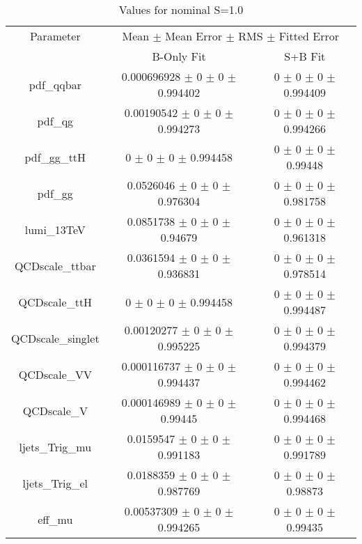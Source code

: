 \begin{table}
\centering
\caption{Values for nominal S=1.0}
\begin{tabular}{ccc}
\toprule
Parameter 	& \multicolumn{2}{c}{Mean $\pm$ Mean Error $\pm$ RMS $\pm$ Fitted Error}\\
 	& B-Only Fit & S+B Fit\\
\midrule
pdf\_qqbar 	& \num{0.000696928} $\pm$ \num{0} $\pm$ \num{0} $\pm$ \num{0.994402} 	& \num{0} $\pm$ \num{0} $\pm$ \num{0} $\pm$ \num{0.994409}\\
pdf\_qg 	& \num{0.00190542} $\pm$ \num{0} $\pm$ \num{0} $\pm$ \num{0.994273} 	& \num{0} $\pm$ \num{0} $\pm$ \num{0} $\pm$ \num{0.994266}\\
pdf\_gg\_ttH 	& \num{0} $\pm$ \num{0} $\pm$ \num{0} $\pm$ \num{0.994458} 	& \num{0} $\pm$ \num{0} $\pm$ \num{0} $\pm$ \num{0.99448}\\
pdf\_gg 	& \num{0.0526046} $\pm$ \num{0} $\pm$ \num{0} $\pm$ \num{0.976304} 	& \num{0} $\pm$ \num{0} $\pm$ \num{0} $\pm$ \num{0.981758}\\
lumi\_13TeV 	& \num{0.0851738} $\pm$ \num{0} $\pm$ \num{0} $\pm$ \num{0.94679} 	& \num{0} $\pm$ \num{0} $\pm$ \num{0} $\pm$ \num{0.961318}\\
QCDscale\_ttbar 	& \num{0.0361594} $\pm$ \num{0} $\pm$ \num{0} $\pm$ \num{0.936831} 	& \num{0} $\pm$ \num{0} $\pm$ \num{0} $\pm$ \num{0.978514}\\
QCDscale\_ttH 	& \num{0} $\pm$ \num{0} $\pm$ \num{0} $\pm$ \num{0.994458} 	& \num{0} $\pm$ \num{0} $\pm$ \num{0} $\pm$ \num{0.994487}\\
QCDscale\_singlet 	& \num{0.00120277} $\pm$ \num{0} $\pm$ \num{0} $\pm$ \num{0.995225} 	& \num{0} $\pm$ \num{0} $\pm$ \num{0} $\pm$ \num{0.994379}\\
QCDscale\_VV 	& \num{0.000116737} $\pm$ \num{0} $\pm$ \num{0} $\pm$ \num{0.994437} 	& \num{0} $\pm$ \num{0} $\pm$ \num{0} $\pm$ \num{0.994462}\\
QCDscale\_V 	& \num{0.000146989} $\pm$ \num{0} $\pm$ \num{0} $\pm$ \num{0.99445} 	& \num{0} $\pm$ \num{0} $\pm$ \num{0} $\pm$ \num{0.994468}\\
ljets\_Trig\_mu 	& \num{0.0159547} $\pm$ \num{0} $\pm$ \num{0} $\pm$ \num{0.991183} 	& \num{0} $\pm$ \num{0} $\pm$ \num{0} $\pm$ \num{0.991789}\\
ljets\_Trig\_el 	& \num{0.0188359} $\pm$ \num{0} $\pm$ \num{0} $\pm$ \num{0.987769} 	& \num{0} $\pm$ \num{0} $\pm$ \num{0} $\pm$ \num{0.98873}\\
eff\_mu 	& \num{0.00537309} $\pm$ \num{0} $\pm$ \num{0} $\pm$ \num{0.994265} 	& \num{0} $\pm$ \num{0} $\pm$ \num{0} $\pm$ \num{0.99435}\\

\end{tabular}
\end{table}
